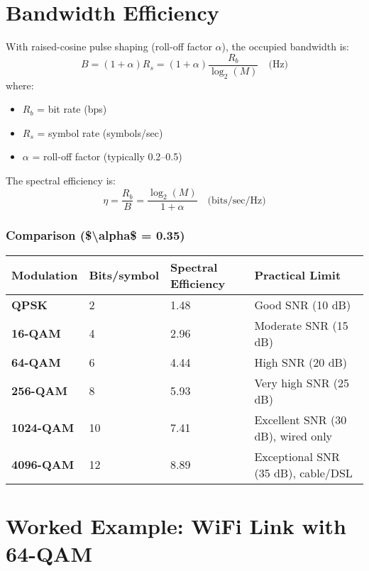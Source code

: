 \section{Bandwidth Efficiency}

With raised-cosine pulse shaping (roll-off factor $\alpha$), the occupied bandwidth is:
\begin{equation}
B = (1 + \alpha) R_s = (1 + \alpha) \frac{R_b}{\log_2(M)} \quad \text{(Hz)}
\label{eq:qam-bandwidth}
\end{equation}
where:
\begin{itemize}
\item $R_b$ = bit rate (bps)
\item $R_s$ = symbol rate (symbols/sec)
\item $\alpha$ = roll-off factor (typically 0.2--0.5)
\end{itemize}

The spectral efficiency is:
\begin{equation}
\eta = \frac{R_b}{B} = \frac{\log_2(M)}{1 + \alpha} \quad \text{(bits/sec/Hz)}
\label{eq:qam-spectral-efficiency}
\end{equation}

\subsubsection{Comparison (\$\textbackslash alpha\$ =
0.35)}\label{comparison-ux3b1-0.35}

{\def\LTcaptype{} %
\begin{longtable}[]{@{}llll@{}}
\toprule\noalign{}
Modulation & Bits/symbol & Spectral Efficiency & Practical Limit \\
\midrule\noalign{}
\endhead
\bottomrule\noalign{}
\endlastfoot
\textbf{QPSK} & 2 & 1.48 & Good SNR (10 dB) \\
\textbf{16-QAM} & 4 & 2.96 & Moderate SNR (15 dB) \\
\textbf{64-QAM} & 6 & 4.44 & High SNR (20 dB) \\
\textbf{256-QAM} & 8 & 5.93 & Very high SNR (25 dB) \\
\textbf{1024-QAM} & 10 & 7.41 & Excellent SNR (30 dB), wired only \\
\textbf{4096-QAM} & 12 & 8.89 & Exceptional SNR (35 dB), cable/DSL \\
\end{longtable}
}

\section{Worked Example: WiFi Link with 64-QAM}

